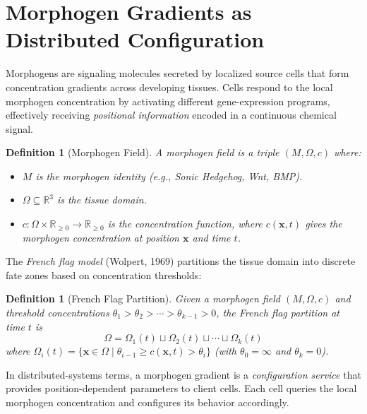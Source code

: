 \documentclass[12pt,a4paper]{article}
\newtheorem{definition}[theorem]{Definition}
\newcommand{\eg}{\textit{e.g.}}
\begin{document}
\section{Morphogen Gradients as Distributed Configuration}\label{sec:morphogens}

Morphogens are signaling molecules secreted by localized source cells
that form concentration gradients across developing tissues.  Cells
respond to the local morphogen concentration by activating different
gene-expression programs, effectively receiving \emph{positional
information} encoded in a continuous chemical signal.

\begin{definition}[Morphogen Field]\label{def:morphogen-field}
A \emph{morphogen field} is a triple $(M, \Omega, c)$ where:
\begin{itemize}
  \item $M$ is the morphogen identity (\eg, Sonic Hedgehog, Wnt, BMP).
  \item $\Omega \subseteq \mathbb{R}^3$ is the tissue domain.
  \item $c : \Omega \times \mathbb{R}_{\geq 0} \to \mathbb{R}_{\geq 0}$
    is the concentration function, where $c(\mathbf{x}, t)$ gives the
    morphogen concentration at position $\mathbf{x}$ and time $t$.
\end{itemize}
\end{definition}

The \emph{French flag model} (Wolpert, 1969) partitions the tissue
domain into discrete fate zones based on concentration thresholds:

\begin{definition}[French Flag Partition]\label{def:french-flag}
Given a morphogen field $(M, \Omega, c)$ and threshold concentrations
$\theta_1 > \theta_2 > \cdots > \theta_{k-1} > 0$, the \emph{French
flag partition} at time $t$ is
\[
  \Omega = \Omega_1(t) \sqcup \Omega_2(t) \sqcup \cdots \sqcup \Omega_k(t)
\]
where $\Omega_i(t) = \{ \mathbf{x} \in \Omega \mid \theta_{i-1} \geq
c(\mathbf{x},t) > \theta_i \}$ (with $\theta_0 = \infty$ and
$\theta_k = 0$).
\end{definition}

In distributed-systems terms, a morphogen gradient is a
\emph{configuration service} that provides position-dependent
parameters to client cells.  Each cell queries the local morphogen
concentration and configures its behavior accordingly.
\end{document}
